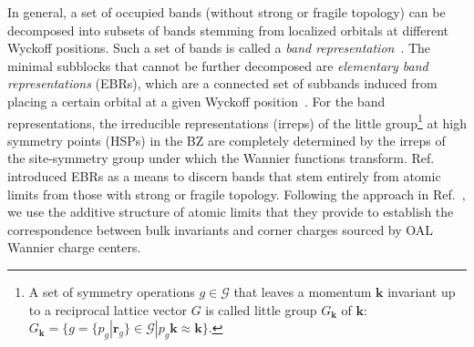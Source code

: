 In general, a set of occupied bands (without strong or fragile topology) can be decomposed into subsets of bands stemming from localized orbitals at different Wyckoff positions. Such a set of bands is called a \emph{band representation}~\cite{Bradlyn17}. The minimal subblocks that cannot be further decomposed are \emph{elementary band representations} (EBRs), which are a connected set of subbands induced from placing a certain orbital at a given Wyckoff position~\cite{Slager12,Slager17,Bradlyn17,Cano17,Cano17-2,BarryFragile,ZakEBR1,ZakEBR2}. For the band representations, the irreducible representations (irreps) of the little group\footnote{A set of symmetry operations $g \in \mathcal{G}$ that leaves a momentum $\mathbf{k}$ invariant up to a reciprocal lattice vector $G$ is called little group $G_{\mathbf{k}}$ of $\mathbf{k}$: $G_{\mathbf{k}} = \lbrace g = \lbrace p_g | \mathbf{r}_g \rbrace \in \mathcal{G} | p_g \mathbf{k} \approx \mathbf{k} \rbrace$.} at high symmetry points (HSPs) in the BZ are completely determined by the irreps of the site-symmetry group under which the Wannier functions transform. Ref.~\cite{Bradlyn17} introduced EBRs as a means to discern bands that stem entirely from atomic limits from those with strong or fragile topology. Following the approach in Ref.~\cite{benalcazar2018quantization}, we use the additive structure of atomic limits that they provide to establish the correspondence between bulk invariants and corner charges sourced by OAL Wannier charge centers.

